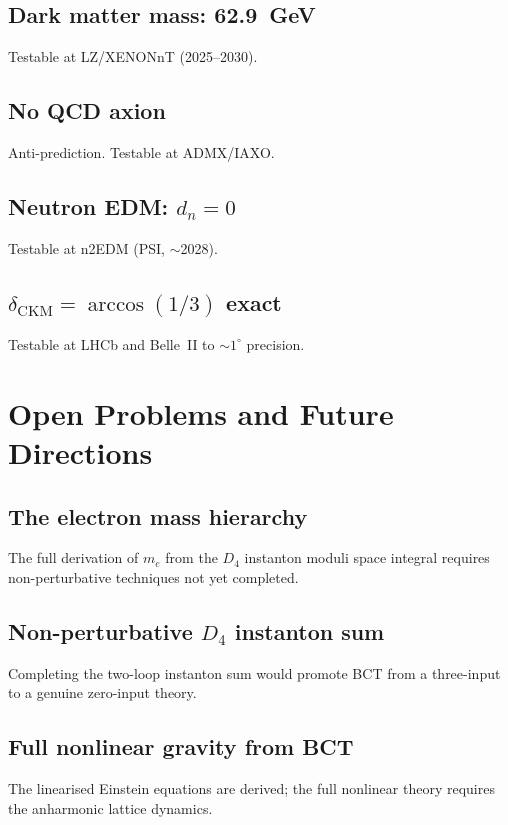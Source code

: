 \documentclass[review,number,sort&compress]{elsarticle}
\newcommand{\Dfour}{D_4}
\begin{document}
\subsection{Dark matter mass: 62.9~GeV}
Testable at LZ/XENONnT (2025--2030).

\subsection{No QCD axion}
Anti-prediction. Testable at ADMX/IAXO.

\subsection{Neutron EDM: $d_n = 0$}
Testable at n2EDM (PSI, $\sim$2028).

\subsection{$\delta_{\mathrm{CKM}} = \arccos(1/3)$ exact}
Testable at LHCb and Belle~II to $\sim 1^\circ$ precision.

\section{Open Problems and Future Directions}
\label{sec:open}

\subsection{The electron mass hierarchy}
The full derivation of $m_e$ from the $\Dfour$ instanton moduli space
integral requires non-perturbative techniques not yet completed.

\subsection{Non-perturbative $\Dfour$ instanton sum}
Completing the two-loop instanton sum would promote BCT from a
three-input to a genuine zero-input theory.

\subsection{Full nonlinear gravity from BCT}
The linearised Einstein equations are derived; the full nonlinear
theory requires the anharmonic lattice dynamics.
\end{document}
